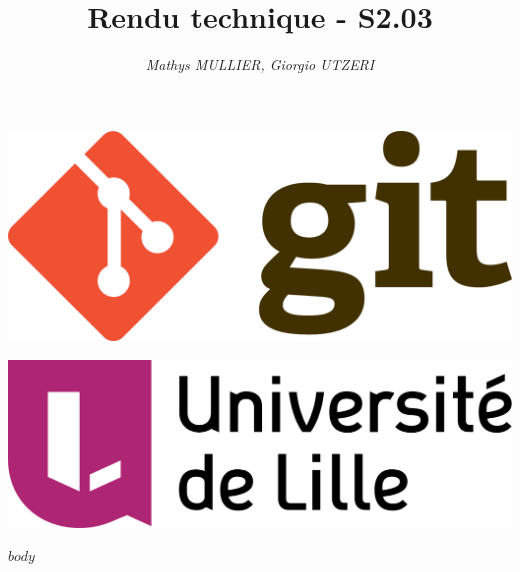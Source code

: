 \documentclass[a4paper]{article}
\begin{document}
\title{\textbf{Rendu technique - S2.03}}
\author{\textit{Mathys MULLIER, Giorgio UTZERI}}
\date{} %

\maketitle

\begin{center}
    \begin{minipage}{0.4\linewidth}
        \centering
        \includegraphics[width=0.5\linewidth]{assets/git-logo.png}
    \end{minipage}
    \begin{minipage}{0.4\linewidth}
        \centering
        \includegraphics[width=0.5\linewidth]{assets/univ-lille.png}
    \end{minipage}
\end{center}

\tableofcontents

$body$
\end{document}

